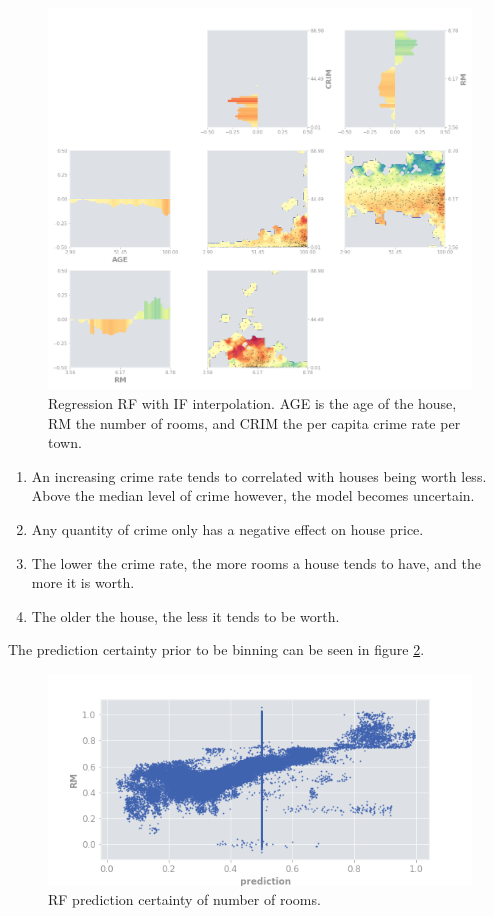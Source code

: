 \documentclass[a4paper, oneside, twocolumn]{article}
\begin{document}
\begin{figure}
\centering
\includegraphics[width=\columnwidth]{img/reg_rf_if_matrix.png}
\caption{Regression RF with IF interpolation. AGE is the age of the house, RM the number of rooms, and CRIM the per capita crime rate per town.}
\label{fig:reg-rf-if-matrix}
\end{figure}

\begin{enumerate}
\item An increasing crime rate tends to correlated with houses being worth less. Above the median level of crime however, the model becomes uncertain.
\item Any quantity of crime only has a negative effect on house price.
\item The lower the crime rate, the more rooms a house tends to have, and the more it is worth.
\item The older the house, the less it tends to be worth.
\end{enumerate}

The prediction certainty prior to be binning can be seen in figure \ref{fig:reg-rf-if-rm}.

\begin{figure}
\centering
\includegraphics[width=0.7\columnwidth]{img/reg_rf_if_rm.png}
\caption{RF prediction certainty of number of rooms.}
\label{fig:reg-rf-if-rm}
\end{figure}
\end{document}
